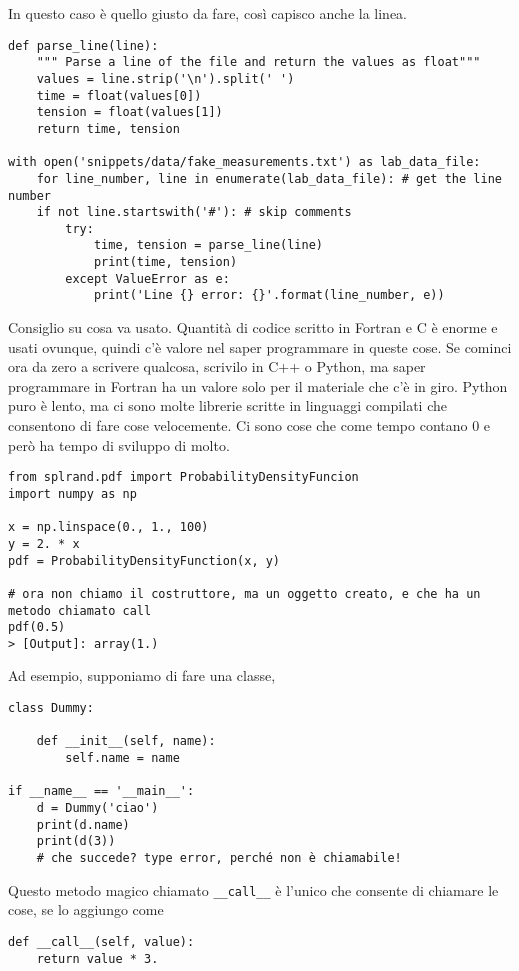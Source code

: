 \documentclass[10pt, a4paper, titlepage]{book}
\begin{document}
In questo caso è quello giusto da fare, così capisco anche la linea.

\begin{verbatim}
def parse_line(line):
	""" Parse a line of the file and return the values as float"""
	values = line.strip('\n').split(' ')
	time = float(values[0])
	tension = float(values[1])
	return time, tension

with open('snippets/data/fake_measurements.txt') as lab_data_file:
	for line_number, line in enumerate(lab_data_file): # get the line number
	if not line.startswith('#'): # skip comments
		try:
			time, tension = parse_line(line)
			print(time, tension)
		except ValueError as e:
			print('Line {} error: {}'.format(line_number, e))
\end{verbatim}

Consiglio su cosa va usato. Quantità di codice scritto in Fortran e C è enorme e usati ovunque, quindi c'è valore nel saper programmare in queste cose. Se cominci ora da zero a scrivere qualcosa, scrivilo in C++ o Python, ma saper programmare in Fortran ha un valore solo per il materiale che c'è in giro.
Python puro è lento, ma ci sono molte librerie scritte in linguaggi compilati che consentono di fare cose velocemente. Ci sono cose che come tempo contano 0 e però ha tempo di sviluppo di molto.

\begin{verbatim}
from splrand.pdf import ProbabilityDensityFuncion
import numpy as np

x = np.linspace(0., 1., 100)
y = 2. * x
pdf = ProbabilityDensityFunction(x, y)

# ora non chiamo il costruttore, ma un oggetto creato, e che ha un metodo chiamato call
pdf(0.5)
> [Output]: array(1.)
\end{verbatim}

Ad esempio, supponiamo di fare una classe, 

\begin{verbatim}
class Dummy:

	def __init__(self, name):
		self.name = name

if __name__ == '__main__':
	d = Dummy('ciao')
	print(d.name)
	print(d(3))
	# che succede? type error, perché non è chiamabile!
\end{verbatim}

Questo metodo magico chiamato \texttt{__call__} è l'unico che consente di chiamare le cose, se lo aggiungo come 

\begin{verbatim}
def __call__(self, value):
	return value * 3.
\end{verbatim}
\end{document}
